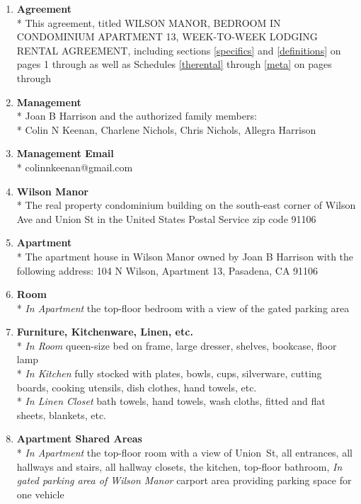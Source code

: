 \documentclass[]{article}
\newcommand{\agreementtitle}{WILSON MANOR, BEDROOM IN CONDOMINIUM APARTMENT 13, WEEK-TO-WEEK LODGING RENTAL AGREEMENT}
\newcommand{\agreementdef}{agreement, titled \agreementtitle{}, including sections \ref{specifics} and \ref{definitions} on pages 1 through \pageref{acceptance} as well as Schedules \ref{therental} through \ref{meta} on pages \pageref{therental} through \pageref{LastPage}}
\newcommand{\mom}{Joan B Harrison}
\newcommand{\management}{Management}
\newcommand{\myemail}{Management Email}
\newcommand{\condo}{Wilson Manor}
\newcommand{\apt}{Apartment}
\newcommand{\room}{Room}
\newcommand{\furniture}{Furniture, Kitchenware, Linen, etc.}
\newcommand{\shared}{Apartment Shared Areas}
\begin{document}
\begin{multicols}{2}
	\begin{enumerate} 
		\item \textbf{Agreement}\\* \label{agreement}
			This \agreementdef{}

			\vfill
			\columnbreak

		\item \textbf{\management{}}\\* \label{management}
			\noindent \mom{}
			and the authorized family members:\\*
			Colin N Keenan,
			Charlene Nichols,
			Chris Nichols,
			Allegra Harrison

		\item \textbf{\myemail{}}\\* \label{myemail}
			colinnkeenan@gmail.com

		\item \textbf{\condo{}}\\* \label{condo}
			The real property condominium building on the south-east corner of Wilson Ave and Union St in the United States Postal Service zip code 91106

		\item \textbf{\apt{}}\\* \label{apt}
			The apartment house in \condo{} owned by \mom{} with the following address:
			104 N Wilson, \apt{} 13,
			Pasadena, CA  91106

		\item \textbf{\room{}}\\* \label{room}
			\textit{In \apt{}}
			the top-floor bedroom with a view of the gated parking area

		\item \textbf{\furniture{}}\\* \label{furniture}
			\textit{In \room{}}
			queen-size bed on frame, large dresser, shelves, bookcase, floor lamp\\*
			\textit{In Kitchen}
			fully stocked with plates, bowls, cups, silverware, cutting boards, cooking utensils, dish clothes, hand towels, etc.\\*
			\textit{In Linen Closet}
			bath towels, hand towels, wash cloths, fitted and flat sheets, blankets, etc.

		\item \textbf{\shared{}}\\* \label{shared}
			\textit{In \apt{}}
			the top-floor room with a view of Union~St,
			all entrances,
			all hallways and stairs,
			all hallway closets,
			the kitchen,
			top-floor bathroom,
			\textit{In gated parking area of \condo{}}
			carport area providing parking space for one vehicle
			

\end{enumerate}
\end{multicols}
\end{document}
